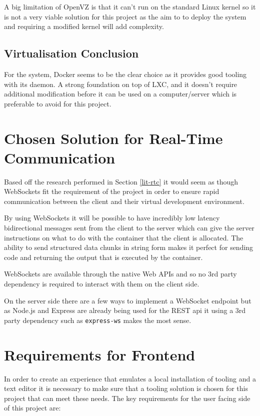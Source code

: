 A big limitation of OpenVZ is that it can't run on the standard Linux kernel so it is not a very viable solution for this project as the aim to to deploy the system and requiring a modified kernel will add complexity.

\subsection{Virtualisation Conclusion}

For the system, Docker seems to be the clear choice as it provides good tooling with its daemon. A strong foundation on top of LXC, and it doesn't require additional modification before it can be used on a computer/server which is preferable to avoid for this project.

\section{Chosen Solution for Real-Time Communication} \label{solapp-rtc}

Based off the research performed in Section \ref{lit-rtc} it would seem as though WebSockets fit the requirement of the project in order to ensure rapid communication between the client and their virtual development environment.

By using WebSockets it will be possible to have incredibly low latency bidirectional messages sent from the client to the server which can give the server instructions on what to do with the container that the client is allocated. The ability to send structured data chunks in string form makes it perfect for sending code and returning the output that is executed by the container.

WebSockets are available through the native Web APIs and so no 3rd party dependency is required to interact with them on the client side.

On the server side there are a few ways to implement a WebSocket endpoint but as Node.js and Express are already being used for the REST api it using a 3rd party dependency such as \texttt{express-ws} makes the most sense.

\section{Requirements for Frontend} \label{solapp-frontend}

In order to create an experience that emulates a local installation of tooling and a text editor it is necessary to make sure that a tooling solution is chosen for this project that can meet these needs. The key requirements for the user facing side of this project are:

